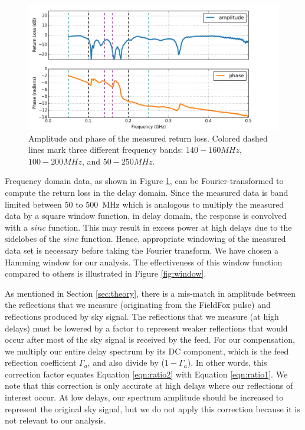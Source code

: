 \documentclass[12pt,preprint]{aastex}
\begin{document}
\begin{figure}[ht!]
\centering
\includegraphics[totalheight=0.4\textheight]{plots/frequency_amp_phase_fullbw.png}
\caption{Amplitude and phase of the measured return loss. Colored dashed lines
mark three different frequency bands: $140-160MHz$, $100-200MHz$, and
$50-250MHz$.}
\label{fig:freq}
\end{figure}

Frequency domain data, as shown in Figure \ref{fig:freq}, can be Fourier-transformed to compute the return loss in the delay domain. Since the measured data is band limited between 50 to 500~MHz which is analogous to multiply the measured data by a square window function, in delay domain, the response is convolved with a $sinc$ function. This may result in excess power at high
delays due to the sidelobes of the $sinc$ function. Hence, appropriate windowing of the measured data set is necessary before taking the Fourier transform.
We have chosen a Hamming window for our analysis. The effectiveness of this
window function compared to others is illustrated in Figure
\ref{fig:window}. 

As mentioned in Section \ref{sec:theory}, there is a mis-match in amplitude
between the reflections that we measure (originating from the FieldFox pulse)
and reflections produced by sky signal. The reflections that we measure (at high
delays) must be lowered by a factor to represent weaker reflections that would
occur after most of the sky signal is received by the feed. For our
compensation, we multiply our entire delay spectrum by its DC component, which is the feed reflection coefficient $\Gamma_{a}$, and also divide by ($1-\Gamma_{a}$). In other words, this correction factor equates Equation \ref{eqn:ratio2} with Equation \ref{eqn:ratio1}. 
We note that this correction is only accurate at high delays where our
reflections of interest occur. At low delays, our spectrum amplitude should be
increased to represent the original sky signal, but we do not apply this
correction because it is not relevant to our analysis.
\end{document}
